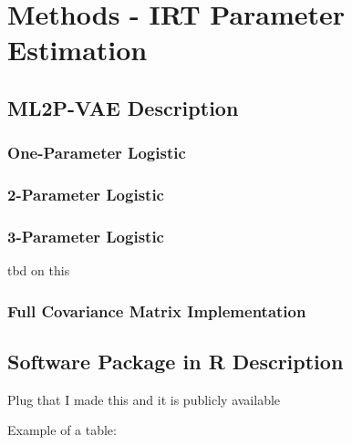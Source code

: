 \section{Methods - IRT Parameter Estimation}

\subsection{ML2P-VAE Description}

\subsubsection{One-Parameter Logistic}

\subsubsection{2-Parameter Logistic}

\subsubsection{3-Parameter Logistic}
tbd on this

\subsubsection{Full Covariance Matrix Implementation}

\subsection{Software Package in R Description}
Plug that I made this and it is publicly available




Example of a table:
